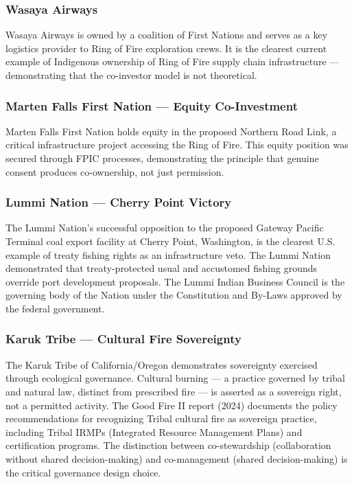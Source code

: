 \documentclass[11pt,letterpaper]{article}
\begin{document}
\subsubsection{Wasaya Airways}

Wasaya Airways is owned by a coalition of First Nations and serves as a key logistics provider to Ring of Fire exploration crews. It is the clearest current example of Indigenous ownership of Ring of Fire supply chain infrastructure --- demonstrating that the co-investor model is not theoretical.

\subsubsection{Marten Falls First Nation --- Equity Co-Investment}

Marten Falls First Nation holds equity in the proposed Northern Road Link, a critical infrastructure project accessing the Ring of Fire. This equity position was secured through FPIC processes, demonstrating the principle that genuine consent produces co-ownership, not just permission.

\subsubsection{Lummi Nation --- Cherry Point Victory}

The Lummi Nation's successful opposition to the proposed Gateway Pacific Terminal coal export facility at Cherry Point, Washington, is the clearest U.S. example of treaty fishing rights as an infrastructure veto. The Lummi Nation demonstrated that treaty-protected usual and accustomed fishing grounds override port development proposals. The Lummi Indian Business Council is the governing body of the Nation under the Constitution and By-Laws approved by the federal government.

\subsubsection{Karuk Tribe --- Cultural Fire Sovereignty}

The Karuk Tribe of California/Oregon demonstrates sovereignty exercised through ecological governance. Cultural burning --- a practice governed by tribal and natural law, distinct from prescribed fire --- is asserted as a sovereign right, not a permitted activity. The Good Fire II report (2024) documents the policy recommendations for recognizing Tribal cultural fire as sovereign practice, including Tribal IRMPs (Integrated Resource Management Plans) and certification programs. The distinction between co-stewardship (collaboration without shared decision-making) and co-management (shared decision-making) is the critical governance design choice.
\end{document}
